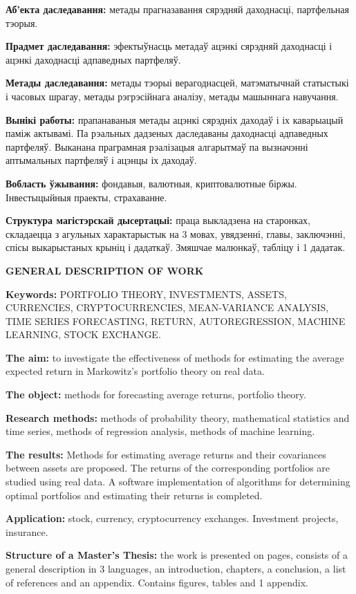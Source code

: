 \textbf{Аб’екта даследавання:} 
метады прагназавання сярэдняй даходнасці, партфельная тэорыя.

\textbf{Прадмет даследавання:}
эфектыўнасць метадаў ацэнкі сярэдняй даходнасці і ацэнкі даходнасці адпаведных партфеляў.

\textbf{Метады даследавання:}
метады тэорыі верагоднасцей, матэматычнай статыстыкі і часовых шрагау, метады рэгрэсійнага аналізу, метады машыннага навучання.

\textbf{Вынікі работы:}
прапанаваныя метады ацэнкі сярэдніх даходаў і іх каварыацый паміж актывамі. Па рэальных дадзеных даследаваны даходнасці адпаведных партфеляў.
Выканана праграмная рэалізацыя алгарытмаў па вызначэнні аптымальных партфеляў і ацэнцы іх даходаў.

\textbf{Вобласть ўжывання:}
фондавыя, валютныя, криптовалютные біржы. Інвестыцыйныя праекты, страхаванне.

\textbf{Структура магістэрскай дысертацыі:}
праца выкладзена на \pageref{LastPage} старонках, складаецца з агульных характарыстык на 3 мовах, увядзенні,
\totalchapters{} главы, заключэнні, спісы выкарыстаных крыніц і дадаткаў.
Змяшчае \totalfigures{} малюнкаў, \totaltables{} табліцу і 1 дадатак.

\newpage
{}
\begin{center}
	\textbf{\large GENERAL DESCRIPTION OF WORK}
\end{center}

\textbf{Keywords:}
PORTFOLIO THEORY, INVESTMENTS, ASSETS, CURRENCIES, CRYPTOCURRENCIES, MEAN-VARIANCE ANALYSIS, 
TIME SERIES FORECASTING, RETURN, AUTOREGRESSION, MACHINE LEARNING, STOCK EXCHANGE.

\textbf{The aim:}
to investigate the effectiveness of methods for estimating the average expected return in Markowitz's portfolio theory on real data.

\textbf{The object:}
methods for forecasting average returns, portfolio theory.

\textbf{Research methods:} 
methods of probability theory, mathematical statistics and time series, methods of regression analysis, methods of machine learning.

\textbf{The results:}
Methods for estimating average returns and their covariances between assets are proposed. 
The returns of the corresponding portfolios are studied using real data. 
A software implementation of algorithms for determining optimal portfolios and estimating their returns is completed.

\textbf{Application:}
stock, currency, cryptocurrency exchanges. Investment projects, insurance.

\textbf{Structure of a Master's Thesis:}
the work is presented on \pageref{LastPage} pages, consists of a general description in 3 languages, an introduction,
\totalchapters{} chapters, a conclusion, a list of references and an appendix.
Contains \totalfigures{} figures, \totaltables{} tables and 1 appendix.